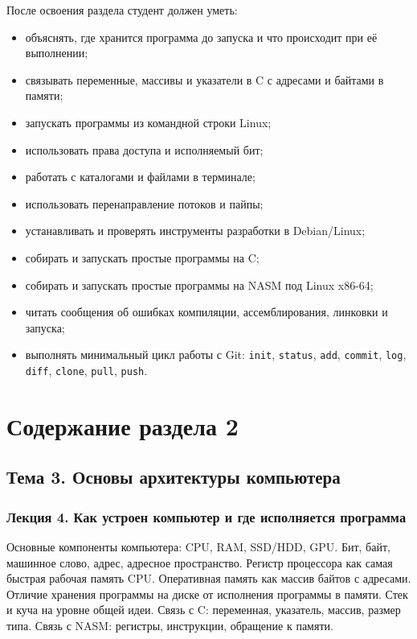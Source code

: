 \documentclass[a4paper,14pt]{extreport}
\begin{document}
После освоения раздела студент должен уметь:

\begin{itemize}
    \item объяснять, где хранится программа до запуска и что происходит при её выполнении;
    \item связывать переменные, массивы и указатели в C с адресами и байтами в памяти;
    \item запускать программы из командной строки Linux;
    \item использовать права доступа и исполняемый бит;
    \item работать с каталогами и файлами в терминале;
    \item использовать перенаправление потоков и пайпы;
    \item устанавливать и проверять инструменты разработки в Debian/Linux;
    \item собирать и запускать простые программы на C;
    \item собирать и запускать простые программы на NASM под Linux x86-64;
    \item читать сообщения об ошибках компиляции, ассемблирования, линковки и запуска;
    \item выполнять минимальный цикл работы с Git: \texttt{init}, \texttt{status}, \texttt{add}, \texttt{commit}, \texttt{log}, \texttt{diff}, \texttt{clone}, \texttt{pull}, \texttt{push}.
\end{itemize}

\chapter{Содержание раздела 2}

\section{Тема 3. Основы архитектуры компьютера}

\subsection*{Лекция 4. Как устроен компьютер и где исполняется программа}

Основные компоненты компьютера: CPU, RAM, SSD/HDD, GPU. Бит, байт, машинное слово, адрес, адресное пространство. Регистр процессора как самая быстрая рабочая память CPU. Оперативная память как массив байтов с адресами. Отличие хранения программы на диске от исполнения программы в памяти. Стек и куча на уровне общей идеи. Связь с C: переменная, указатель, массив, размер типа. Связь с NASM: регистры, инструкции, обращение к памяти.
\end{document}
